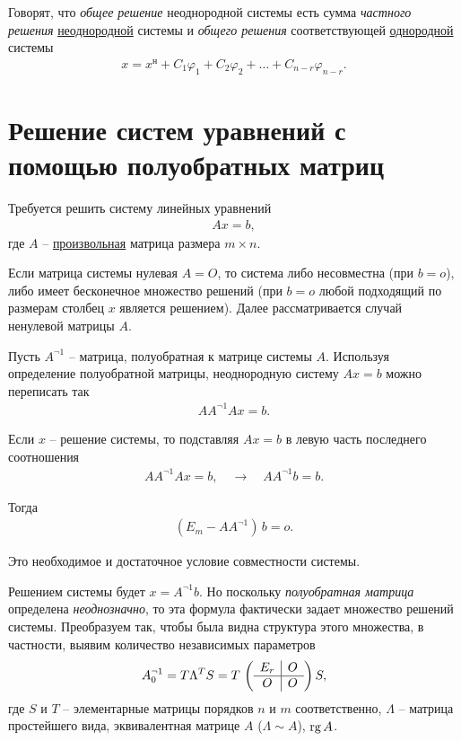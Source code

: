 \documentclass[%
	11pt,
	a4paper,
	utf8,
		]{article}
\begin{document}
Говорят, что \emph{общее решение} неоднородной системы есть сумма \emph{частного решения} \underline{неоднородной} системы и \emph{общего решения} соответствующей \underline{однородной} системы \cite[]{bortakovskiy:2005}
\begin{align*}
	x = x^\text{н} + C_1 \varphi_1 + C_2 \varphi_2 + \ldots + C_{n - r} \varphi_{n - r}.
\end{align*}


\section{Решение систем уравнений с помощью полуобратных матриц}

Требуется решить систему линейных уравнений
\begin{align*}
	A x = b,
\end{align*}
где $ A $ -- \underline{произвольная} матрица размера $ m \times n $.

Если матрица системы нулевая $ A = O $, то система либо несовместна (при $ b = o $), либо имеет бесконечное множество решений (при $ b = o $ любой подходящий по размерам столбец $ x $ является решением). Далее рассматривается случай ненулевой матрицы $ A $.

Пусть $ A^{\neg 1} $ -- матрица, полуобратная к матрице системы $ A $. Используя определение полуобратной матрицы, неоднородную систему $ Ax = b $ можно переписать так
\begin{align*}
	A A^{\neg 1} A x = b.
\end{align*}

Если $ x $ -- решение системы, то подставляя $ A x = b $ в левую часть последнего соотношения
\begin{align*}
	A A^{\neg 1} A x = b, \quad \rightarrow \quad A A^{\neg 1} b = b.
\end{align*}

Тогда
\begin{align*}
  (E_m - A A^{\neg 1}) \, b = o.
\end{align*}

Это необходимое и достаточное условие совместности системы.

Решением системы будет $ x = A^{\neg 1} b $. Но поскольку \emph{полуобратная матрица} определена \emph{неоднозначно}, то эта формула фактически задает множество решений системы. Преобразуем так, чтобы была видна структура этого множества, в частности, выявим количество независимых параметров
\begin{align*}
  A^{\neg 1}_0 = T \Lambda^T S = T \,
    \begin{pmatrix}
          \begin{array}{c | c}
          	E_r & O \\
          	\hline
          	O & O
          \end{array}
    \end{pmatrix}
    S,
\end{align*}
где $ S $ и $ T $ -- элементарные матрицы порядков $ n $ и $ m $ соответственно, $ \Lambda $ -- матрица простейшего вида, эквивалентная матрице $ A $ ($ \Lambda \sim A $), $ \operatorname*{rg} A $.
\end{document}
